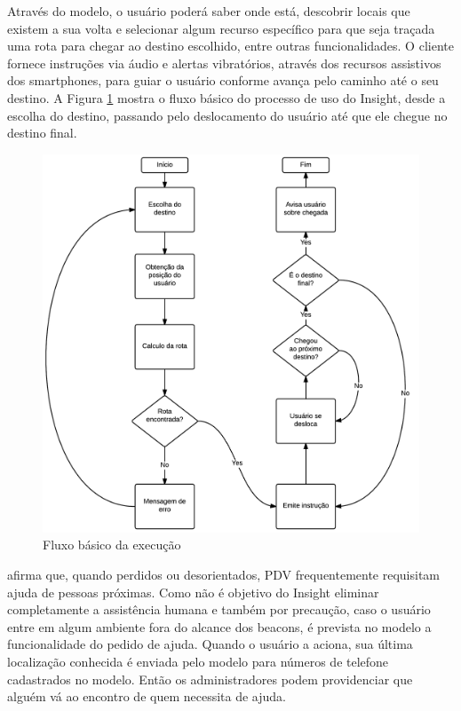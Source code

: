 \documentclass[english,brazilian]{UNISINOSmonografia}
\begin{document}
Através do modelo, o usuário poderá saber onde está, descobrir locais que existem a sua volta e selecionar algum recurso específico para que seja traçada uma rota para chegar ao destino escolhido, entre outras funcionalidades. O cliente fornece instruções via áudio e alertas vibratórios, através dos recursos assistivos dos smartphones, para guiar o usuário conforme avança pelo caminho até o seu destino. A Figura \ref{fig:fluxoBasico} mostra o fluxo básico do processo de uso do Insight, desde a escolha do destino, passando pelo deslocamento do usuário até que ele chegue no destino final.

\begin{figure}[!ht]
	\caption{Fluxo básico da execução}
	\label{fig:fluxoBasico}
	\centering%
	\begin{minipage}{.8\textwidth}
		\includegraphics[width=\textwidth]{imgs/fluxoBasico}
	\end{minipage}
\end{figure}

 afirma que, quando perdidos ou desorientados, PDV frequentemente requisitam ajuda de pessoas próximas. Como não é objetivo do Insight eliminar completamente a assistência humana e também por precaução, caso o usuário entre em algum ambiente fora do alcance dos beacons, é prevista no modelo a funcionalidade do pedido de ajuda. Quando o usuário a aciona, sua última localização conhecida é enviada pelo modelo para números de telefone cadastrados no modelo. Então os administradores podem providenciar que alguém vá ao encontro de quem necessita de ajuda.
\end{document}

